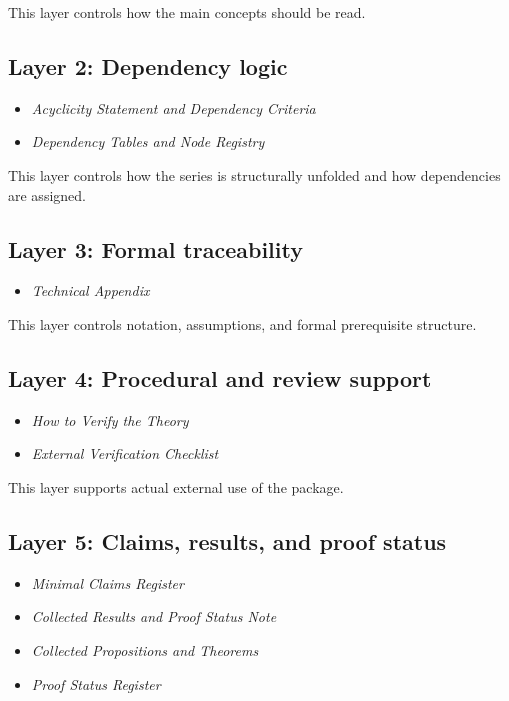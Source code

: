 \documentclass[12pt]{article}
\begin{document}
	This layer controls how the main concepts should be read.
	
	\subsection*{Layer 2: Dependency logic}
	\begin{itemize}[leftmargin=2em]
		\item \emph{Acyclicity Statement and Dependency Criteria}
		\item \emph{Dependency Tables and Node Registry}
	\end{itemize}
	
	This layer controls how the series is structurally unfolded and how dependencies are assigned.
	
	\subsection*{Layer 3: Formal traceability}
	\begin{itemize}[leftmargin=2em]
		\item \emph{Technical Appendix}
	\end{itemize}
	
	This layer controls notation, assumptions, and formal prerequisite structure.
	
	\subsection*{Layer 4: Procedural and review support}
	\begin{itemize}[leftmargin=2em]
		\item \emph{How to Verify the Theory}
		\item \emph{External Verification Checklist}
	\end{itemize}
	
	This layer supports actual external use of the package.
	
	\subsection*{Layer 5: Claims, results, and proof status}
	\begin{itemize}[leftmargin=2em]
		\item \emph{Minimal Claims Register}
		\item \emph{Collected Results and Proof Status Note}
		\item \emph{Collected Propositions and Theorems}
		\item \emph{Proof Status Register}
	\end{itemize}
	
\end{document}
